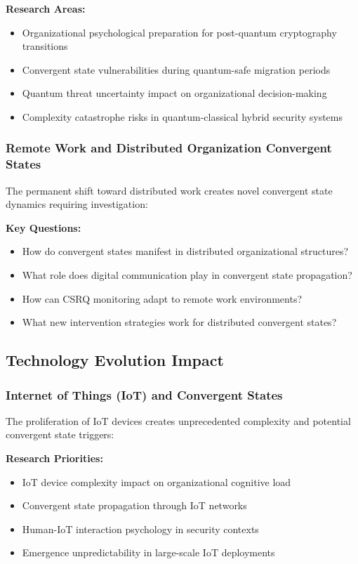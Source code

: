 \documentclass[11pt,a4paper]{article}
\begin{document}
\textbf{Research Areas:}
\begin{itemize}
\item Organizational psychological preparation for post-quantum cryptography transitions
\item Convergent state vulnerabilities during quantum-safe migration periods
\item Quantum threat uncertainty impact on organizational decision-making
\item Complexity catastrophe risks in quantum-classical hybrid security systems
\end{itemize}

\subsubsection{Remote Work and Distributed Organization Convergent States}

The permanent shift toward distributed work creates novel convergent state dynamics requiring investigation:

\textbf{Key Questions:}
\begin{itemize}
\item How do convergent states manifest in distributed organizational structures?
\item What role does digital communication play in convergent state propagation?
\item How can CSRQ monitoring adapt to remote work environments?
\item What new intervention strategies work for distributed convergent states?
\end{itemize}

\subsection{Technology Evolution Impact}

\subsubsection{Internet of Things (IoT) and Convergent States}

The proliferation of IoT devices creates unprecedented complexity and potential convergent state triggers:

\textbf{Research Priorities:}
\begin{itemize}
\item IoT device complexity impact on organizational cognitive load
\item Convergent state propagation through IoT networks
\item Human-IoT interaction psychology in security contexts
\item Emergence unpredictability in large-scale IoT deployments
\end{itemize}
\end{document}

